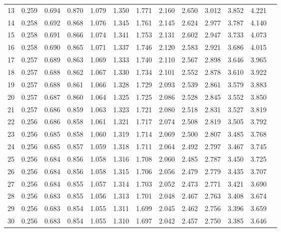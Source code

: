 \begin{table}[ht]
\begin{tabular}{c|c c c c c c c c c c c c}
	13 & 0.259 & 0.694 & 0.870 & 1.079 & 1.350 & 1.771 & 2.160 & 2.650 & 3.012 & 3.852 & 4.221 \\
	14 & 0.258 & 0.692 & 0.868 & 1.076 & 1.345 & 1.761 & 2.145 & 2.624 & 2.977 & 3.787 & 4.140 \\
	15 & 0.258 & 0.691 & 0.866 & 1.074 & 1.341 & 1.753 & 2.131 & 2.602 & 2.947 & 3.733 & 4.073 \\
	16 & 0.258 & 0.690 & 0.865 & 1.071 & 1.337 & 1.746 & 2.120 & 2.583 & 2.921 & 3.686 & 4.015 \\
	17 & 0.257 & 0.689 & 0.863 & 1.069 & 1.333 & 1.740 & 2.110 & 2.567 & 2.898 & 3.646 & 3.965 \\
	18 & 0.257 & 0.688 & 0.862 & 1.067 & 1.330 & 1.734 & 2.101 & 2.552 & 2.878 & 3.610 & 3.922 \\
	19 & 0.257 & 0.688 & 0.861 & 1.066 & 1.328 & 1.729 & 2.093 & 2.539 & 2.861 & 3.579 & 3.883 \\
	20 & 0.257 & 0.687 & 0.860 & 1.064 & 1.325 & 1.725 & 2.086 & 2.528 & 2.845 & 3.552 & 3.850 \\\hline
	21 & 0.257 & 0.686 & 0.859 & 1.063 & 1.323 & 1.721 & 2.080 & 2.518 & 2.831 & 3.527 & 3.819 \\
	22 & 0.256 & 0.686 & 0.858 & 1.061 & 1.321 & 1.717 & 2.074 & 2.508 & 2.819 & 3.505 & 3.792 \\
	23 & 0.256 & 0.685 & 0.858 & 1.060 & 1.319 & 1.714 & 2.069 & 2.500 & 2.807 & 3.485 & 3.768 \\
	24 & 0.256 & 0.685 & 0.857 & 1.059 & 1.318 & 1.711 & 2.064 & 2.492 & 2.797 & 3.467 & 3.745 \\
	25 & 0.256 & 0.684 & 0.856 & 1.058 & 1.316 & 1.708 & 2.060 & 2.485 & 2.787 & 3.450 & 3.725 \\
	26 & 0.256 & 0.684 & 0.856 & 1.058 & 1.315 & 1.706 & 2.056 & 2.479 & 2.779 & 3.435 & 3.707 \\
	27 & 0.256 & 0.684 & 0.855 & 1.057 & 1.314 & 1.703 & 2.052 & 2.473 & 2.771 & 3.421 & 3.690 \\
	28 & 0.256 & 0.683 & 0.855 & 1.056 & 1.313 & 1.701 & 2.048 & 2.467 & 2.763 & 3.408 & 3.674 \\
	29 & 0.256 & 0.683 & 0.854 & 1.055 & 1.311 & 1.699 & 2.045 & 2.462 & 2.756 & 3.396 & 3.659 \\
	30 & 0.256 & 0.683 & 0.854 & 1.055 & 1.310 & 1.697 & 2.042 & 2.457 & 2.750 & 3.385 & 3.646 \\\hline
\end{tabular}
\end{table}